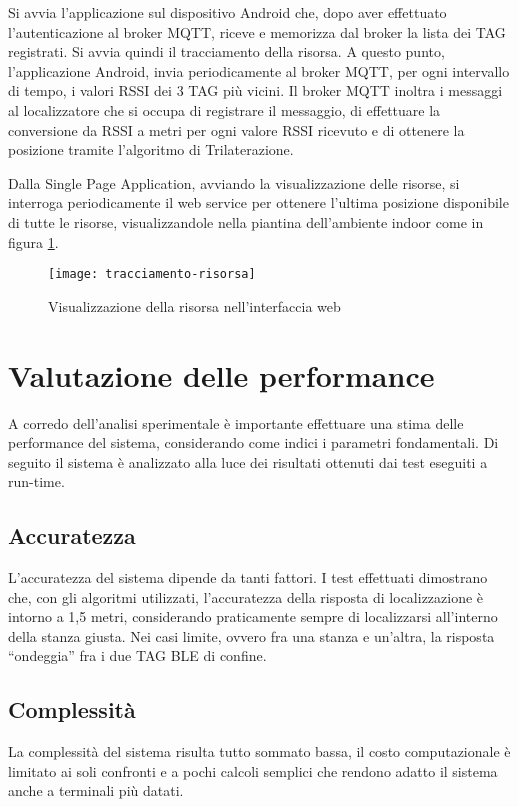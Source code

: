 Si avvia l'applicazione sul dispositivo Android che, dopo aver effettuato l'autenticazione al broker MQTT, riceve e memorizza dal broker la lista dei TAG registrati. Si avvia quindi il tracciamento della risorsa.
A questo punto, l'applicazione Android, invia periodicamente al broker MQTT, per ogni intervallo di tempo, i valori RSSI dei 3 TAG più vicini. Il broker MQTT inoltra i messaggi al localizzatore che si occupa di registrare il messaggio, di effettuare la conversione da RSSI a metri per ogni valore RSSI ricevuto e di ottenere la posizione tramite l'algoritmo di Trilaterazione.

Dalla Single Page Application, avviando la visualizzazione delle risorse, si interroga periodicamente il web service per ottenere l'ultima posizione disponibile di tutte le risorse, visualizzandole nella piantina dell'ambiente indoor come in figura \ref{fig:tracciamento-risorsa}.

\begin{figure}[htp]
	\centering
	\texttt{[image: tracciamento-risorsa]}
	\caption{Visualizzazione della risorsa nell'interfaccia web}
	\label{fig:tracciamento-risorsa}
\end{figure}

\section{Valutazione delle performance}
A corredo dell'analisi sperimentale è importante effettuare una stima delle performance del sistema, considerando come indici i parametri fondamentali. Di seguito il sistema è analizzato alla luce dei risultati ottenuti dai test eseguiti a run-time.

\subsection{Accuratezza}
L'accuratezza del sistema dipende da tanti fattori. I test effettuati dimostrano che, con gli algoritmi utilizzati, l'accuratezza della risposta di localizzazione è intorno a 1,5 metri, considerando praticamente sempre di localizzarsi all'interno della stanza giusta. Nei casi limite, ovvero fra una stanza e un'altra, la risposta ``ondeggia'' fra i due TAG BLE di confine.

\subsection{Complessità}
La complessità del sistema risulta tutto sommato bassa, il costo computazionale è limitato ai soli confronti e a pochi calcoli semplici che rendono adatto il sistema anche a terminali più datati.

